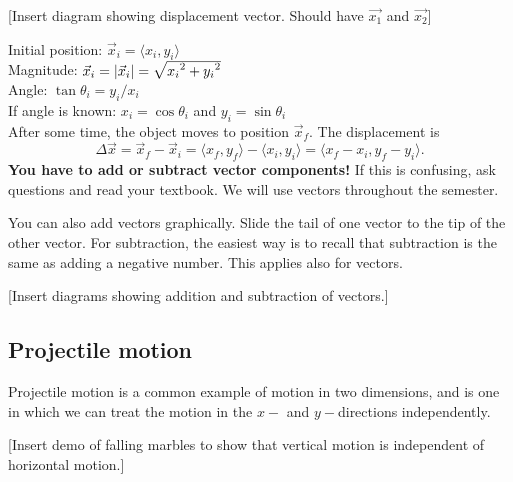 [Insert diagram showing displacement vector. Should have $\vec{x_1}$ and $\vec{x_2}$]
\vspace{5cm}

Initial position: $\vec{x}_i=\langle{x_i,y_i}\rangle$\\
Magnitude: $\vec{x}_i=|\vec{x}_i|=\sqrt{x_i\displaystyle^2+y_i\displaystyle^2}$\\
Angle: $\tan\theta_i=y_i/x_i$\\
If angle is known: $x_i=\cos\theta_i$ and $y_i=\sin\theta_i$\\

After some time, the object moves to position $\vec{x}_f$. The displacement is $$\Delta\vec{x}=\vec{x}_f-\vec{x}_i=\langle{x_f,y_f}\rangle-\langle{x_i,y_i}\rangle=\langle{x_f-x_i,y_f-y_i}\rangle.$$ 
\textbf{You have to add or subtract vector components!} If this is confusing, ask questions and read your textbook. We will use vectors throughout the semester.

You can also add vectors graphically. Slide the tail of one vector to the tip of the other vector. For subtraction, the easiest way is to recall that subtraction is the same as adding a negative number. This applies also for vectors.

[Insert diagrams showing addition and subtraction of vectors.]
\vspace{5cm}

\hrulefill
\subsection{Projectile motion}
Projectile motion is a common example of motion in two dimensions, and is one in which we can treat the motion in the $x-$ and $y-$directions independently.

[Insert demo of falling marbles to show that vertical motion is independent of horizontal motion.]

\clearpage
